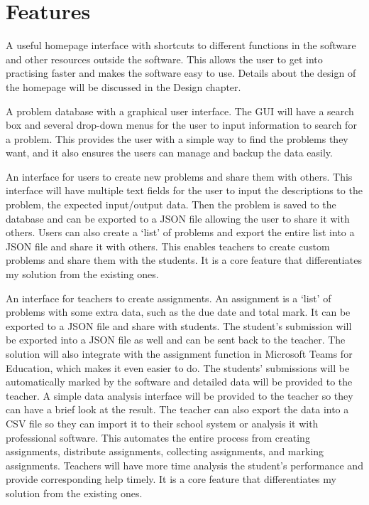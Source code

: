 \documentclass[a4paper]{report}
\begin{document}
\section{Features}

A useful homepage interface with shortcuts to different functions in the software and other resources outside the software. This allows the user to get into practising faster and makes the software easy to use. Details about the design of the homepage will be discussed in the Design chapter.

A problem database with a graphical user interface. The GUI will have a search box and several drop-down menus for the user to input information to search for a problem. This provides the user with a simple way to find the problems they want, and it also ensures the users can manage and backup the data easily.

An interface for users to create new problems and share them with others. This interface will have multiple text fields for the user to input the descriptions to the problem, the expected input/output data. Then the problem is saved to the database and can be exported to a JSON file allowing the user to share it with others. Users can also create a `list' of problems and export the entire list into a JSON file and share it with others. This enables teachers to create custom problems and share them with the students. It is a core feature that differentiates my solution from the existing ones.

An interface for teachers to create assignments. An assignment is a `list' of problems with some extra data, such as the due date and total mark. It can be exported to a JSON file and share with students. The student's submission will be exported into a JSON file as well and can be sent back to the teacher. The solution will also integrate with the assignment function in Microsoft Teams for Education, which makes it even easier to do. The students' submissions will be automatically marked by the software and detailed data will be provided to the teacher. A simple data analysis interface will be provided to the teacher so they can have a brief look at the result. The teacher can also export the data into a CSV file so they can import it to their school system or analysis it with professional software. This automates the entire process from creating assignments, distribute assignments, collecting assignments, and marking assignments. Teachers will have more time analysis the student's performance and provide corresponding help timely. It is a core feature that differentiates my solution from the existing ones.
\end{document}
